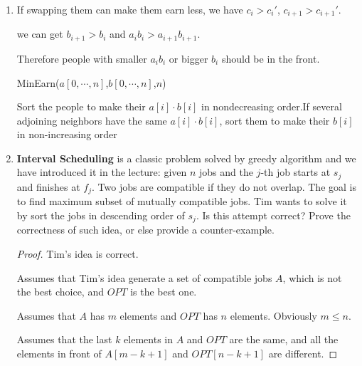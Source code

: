 \documentclass[12pt,a4paper]{article}
\makeatletter
\newtheorem*{solution}{Solution}
\theoremstyle{definition}
\renewenvironment{solution}[1][Solution] {\par\pushQED{\qed}\normalfont\topsep6\p@\@plus6\p@\relax\trivlist\item[\hskip\labelsep\bfseries#1\@addpunct{.}]\ignorespaces}{\popQED\endtrivlist\@endpefalse} \makeatother
\makeatother
\begin{document}
\begin{enumerate}
\begin{solution}
        If swapping them can make them earn less, we have $c_i>c_i'$, $c_{i+1}>c_{i+1}'$.
        
        we can get $b_{i+1}>b_i$ and $a_i b_i>a_{i+1} b_{i+1}$.
        
        Therefore people with smaller $a_i b_i$ or bigger $b_i$ should be in the front.
        
        \begin{minipage}[t]{0.90\textwidth}
        \begin{algorithm}[H]
        	\BlankLine
        	\caption{MinEarn($a[0,\cdots,n]$,$b[0,\cdots,n]$,$n$)}
        	\label{Alg-MinEarn}
        	
        	Sort the people to make their $a[i]\cdot b[i]$ in nondecreasing order.If several adjoining neighbors have the same $a[i]\cdot b[i]$, sort them to make their $b[i]$ in non-increasing order\;
         	
        	\;
        	
        \end{algorithm}
    \end{minipage}
        
    \end{solution}

    \item
    \textbf{Interval Scheduling} is a classic problem solved by greedy algorithm and we have introduced it in the lecture: given $n$ jobs and the $j$-th job starts at $s_j$ and finishes at $f_j$. Two jobs are compatible if they do not overlap. The goal is to find maximum subset of mutually compatible jobs. Tim wants to solve it by sort the jobs in descending order of $s_j$. Is this attempt correct? Prove the correctness of such idea, or else provide a counter-example.

    \begin{proof}
        Tim's idea is correct.
        
        Assumes that Tim's idea generate a set of compatible jobs $A$, which is not the best choice, and $OPT$ is the best one.
        
        Assumes that $A$ has $m$ elements and $OPT$ has $n$ elements. Obviously $m\le n$.
        
        Assumes that the last $k$ elements in $A$ and $OPT$ are the same, and all the elements in front of $A[m-k+1]$ and $OPT[n-k+1]$ are different.
        

\end{proof}
\end{enumerate}
\end{document}
